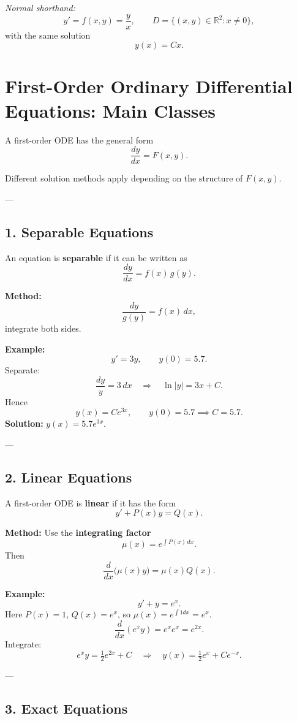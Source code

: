 \documentclass[11pt,a4paper]{article}
\begin{document}
	\emph{Normal shorthand:}
	$$
	y' = f(x,y) = \frac{y}{x}, \qquad D = \{(x,y) \in \mathbb{R}^2 : x \neq 0\},
	$$
	with the same solution
	$$
	y(x) = Cx.
	$$
	\section*{First-Order Ordinary Differential Equations: Main Classes}
	
	A first-order ODE has the general form
	$$
	\frac{dy}{dx} = F(x,y).
	$$
	
	Different solution methods apply depending on the structure of $F(x,y)$.
	
	---
	
	\subsection*{1. Separable Equations}
	
	An equation is \textbf{separable} if it can be written as
	$$
	\frac{dy}{dx} = f(x)\,g(y).
	$$
	
	\textbf{Method:}
	\[
	\frac{dy}{g(y)} = f(x)\,dx,
	\]
	integrate both sides.
	
	\textbf{Example:}
	\[
	y' = 3y, \qquad y(0) = 5.7.
	\]
	Separate:
	\[
	\frac{dy}{y} = 3\,dx \quad \Rightarrow \quad \ln|y| = 3x + C.
	\]
	Hence
	\[
	y(x) = Ce^{3x}, \qquad y(0)=5.7 \implies C=5.7.
	\]
	\textbf{Solution:} $y(x) = 5.7e^{3x}$.
	
	---
	
	\subsection*{2. Linear Equations}
	
	A first-order ODE is \textbf{linear} if it has the form
	$$
	y' + P(x)y = Q(x).
	$$
	
	\textbf{Method:} Use the \textbf{integrating factor}
	\[
	\mu(x) = e^{\int P(x)\,dx}.
	\]
	Then
	\[
	\frac{d}{dx}\big( \mu(x)y \big) = \mu(x) Q(x).
	\]
	
	\textbf{Example:}
	\[
	y' + y = e^x.
	\]
	Here $P(x)=1$, $Q(x)=e^x$, so $\mu(x) = e^{\int 1 dx} = e^x$.
	\[
	\frac{d}{dx}\!\left(e^x y\right) = e^x e^x = e^{2x}.
	\]
	Integrate:
	\[
	e^x y = \tfrac{1}{2} e^{2x} + C \quad \Rightarrow \quad y(x) = \tfrac{1}{2} e^x + C e^{-x}.
	\]
	
	---
	
	\subsection*{3. Exact Equations}
	
\end{document}
